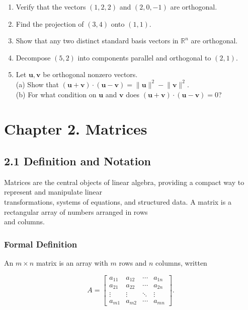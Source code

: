 \documentclass[
  12pt,
  a4paper,
]{article}
\let\oldsection\section
\renewcommand{\section}{\clearpage\oldsection}
\begin{document}
\begin{enumerate}
\def\labelenumi{\arabic{enumi}.}
\item
  Verify that the vectors \((1,2,2)\) and \((2,0,-1)\) are orthogonal.
\item
  Find the projection of \((3,4)\) onto \((1,1)\).
\item
  Show that any two distinct standard basis vectors in \(\mathbb{R}^n\)
  are orthogonal.
\item
  Decompose \((5,2)\) into components parallel and orthogonal to
  \((2,1)\).
\item
  Let \(\mathbf{u}, \mathbf{v}\) be orthogonal nonzero vectors.\\
  (a) Show that
  \((\mathbf{u}+\mathbf{v})\cdot(\mathbf{u}-\mathbf{v})=\lVert \mathbf{u}\rVert^2-\lVert \mathbf{v}\rVert^2.\)\\
  (b) For what condition on \(\mathbf{u}\) and \(\mathbf{v}\) does
  \((\mathbf{u}+\mathbf{v})\cdot(\mathbf{u}-\mathbf{v})=0\)?
\end{enumerate}

\section{Chapter 2. Matrices}\label{chapter-2-matrices}

\subsection{2.1 Definition and
Notation}\label{21-definition-and-notation}

Matrices are the central objects of linear algebra, providing a compact
way to represent and manipulate linear\\
transformations, systems of equations, and structured data. A matrix is
a rectangular array of numbers arranged in rows\\
and columns.

\subsubsection{Formal Definition}\label{formal-definition}

An \(m \times n\) matrix is an array with \(m\) rows and \(n\) columns,
written

\[A =
\begin{bmatrix}
a_{11} & a_{12} & \cdots & a_{1n} \\
a_{21} & a_{22} & \cdots & a_{2n} \\
\vdots & \vdots & \ddots & \vdots \\
a_{m1} & a_{m2} & \cdots & a_{mn}
\end{bmatrix}.\]
\end{document}
